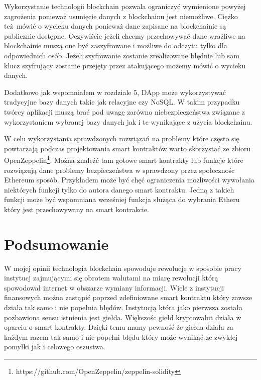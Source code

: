 \documentclass[]{llncs}
\begin{document}
  Wykorzystanie technologii blockchain pozwala ograniczyć wymienione powyżej
  zagrożenia ponieważ usunięcie danych z blockchainu jest niemożliwe. Ciężko
  też mówić o wycieku danych ponieważ dane zapisane na blockchainie są
  publicznie dostępne. Oczywiście jeżeli chcemy przechowywać dane wrażliwe na
  blockchainie muszą one być zaszyfrowane i możliwe do odczytu tylko dla
  odpowiednich osób. Jeżeli szyfrowanie zostanie zrealizowane błędnie lub sam
  klucz szyfrujący zostanie przejęty przez atakującego możemy mówić o wycieku
  danych.

  Dodatkowo jak wspomniałem w rozdziale 5, DApp może wykorzystywać tradycyjne
  bazy danych takie jak relacyjne czy NoSQL. W takim przypadku twórcy aplikacji
  muszą brać pod uwagę zarówno niebezpieczeństwa związane z wykorzystaniem
  wybranej bazy danych jak i te wynikające z użycia blockchainu.

  W celu wykorzystania sprawdzonych rozwiązań na problemy które często się
  powtarzają podczas projektowania smart kontraktów warto skorzystać ze zbioru
  OpenZeppelin\footnote{https://github.com/OpenZeppelin/zeppelin-solidity}.
  Można znaleźć tam gotowe smart kontrakty lub funkcje które rozwiązują dane
  problemy bezpieczeństwa w sprawdzony przez społecznośc Ethereum sposób.
  Przykładem może być chęć ograniczenia możliwości wywołania niektórych funkcji
  tylko do autora danego smart kontraktu. Jedną z takich funkcji może być
  wspomniana wcześniej funkcja służąca do wybrania Etheru który jest
  przechowywany na smart kontrakcie.



\section{Podsumowanie}

  W mojej opinii technologia blockchain spowoduje rewolucję w sposobie pracy
  instytucj zajmującymi się obrotem walutami na miarę rewolucji którą spowodował
  internet w obszarze wymiany informacji. Wiele z instytucji finansowych można
  zastąpić poprzed zdefiniowane smart kontraktu który zawsze działa tak samo i
  nie popełnia błędów. Instytucją która jako pierwsza została pozbawiona sensu
  istnienia jest giełda. Większośc giełd kryptowalut działa w oparciu o smart
  kontrakty. Dzięki temu mamy pewność że giełda działa za każdym razem tak samo
  i nie popełni błędu który może wynikać ze zwykłej pomyłki jak i celowego
  oszustwa.
\end{document}
